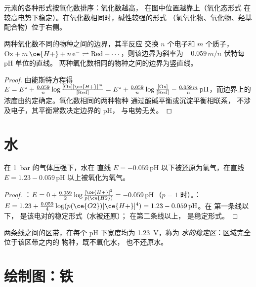 元素的各种形式按氧化数排序：氧化数越高，
在图中位置越靠上（氧化态形式
在较高电势下稳定）。在氧化数相同时，碱性较强的形式
（氢氧化物、氧化物、羟基配合物）位于右侧。

\begin{proposition}[边界的斜率]\label{prop:b1:e-ph-diagrams:boundary-slope}
两种氧化数不同的物种之间的边界，其半反应
交换 $n$ 个电子和 $m$ 个质子，
$\mathrm{Ox} + m\,\ce{H+} + n\,\mathrm{e^-} \rightleftharpoons \mathrm{Red} +
\cdots$，则该边界为斜率为 $-0.059\,m/n$ 伏特每 pH 单位的直线。
两种氧化数相同的物种之间的边界为竖直线。
\end{proposition}

\begin{proof}
由能斯特方程得 $E = E^\circ + \frac{0.059}{n}\log\frac{[\mathrm{Ox}]
[\ce{H+}]^m}{[\mathrm{Red}]} = E^\circ + \frac{0.059}{n}\log\frac{[\mathrm{Ox}]}
{[\mathrm{Red}]} - \frac{0.059\,m}{n}\,\mathrm{pH}$，而边界上的
浓度由约定确定。氧化数相同的两种物种
通过酸碱平衡或沉淀平衡相联系，
不涉及电子，其平衡常数决定边界的 pH，
与电势无关。
\end{proof}

\section{水}

\begin{proposition}[水的两条线]\label{prop:b1:e-ph-diagrams:water-lines}
在 \qty{1}{bar} 的气体压强下，水在
直线 $E = -0.059\,\mathrm{pH}$ 以下被还原为氢气，在直线 $E = 1.23
- 0.059\,\mathrm{pH}$ 以上被氧化为氧气。
\end{proposition}

\begin{proof}
：$E = 0 + \frac{0.059}{2}\log\frac{[\ce{H+}]^2}{p(\ce{H2})}
= -0.059\,\mathrm{pH}$（$p = 1$ 时）。：$E = 1.23 +
\frac{0.059}{4}\log(p(\ce{O2})[\ce{H+}]^4) = 1.23 - 0.059\,\mathrm{pH}$。在
第一条线以下， 是该电对的稳定形式（水被还原）；
在第二条线以上， 是稳定形式。
\end{proof}

\begin{definition}[水的稳定区]\label{def:b1:e-ph-diagrams:water-domain}
两条线之间的区带，在每个 pH 下宽度均为 \qty{1.23}{V}，称为
\emph{水的稳定区}：区域完全位于该区带之内的
物种，既不氧化水，
也不还原水。
\end{definition}

\section{绘制图：铁}

